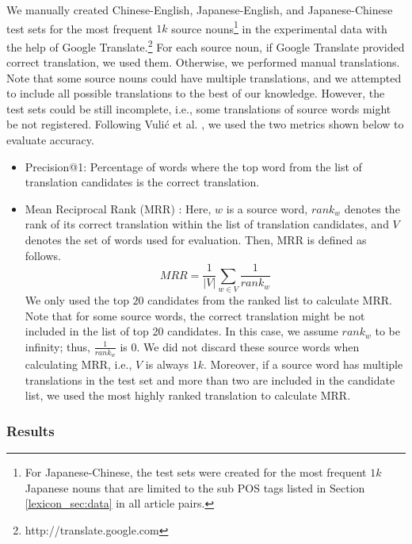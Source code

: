 \documentclass[english]{jnlp_1.4}
\begin{document}
We manually created Chinese-English, Japanese-English, and Japanese-Chinese test sets for
the most frequent $1k$ source nouns\footnote{For Japanese-Chinese,
the test sets were created for the most frequent $1k$ Japanese nouns that are limited to the sub POS tags
listed in Section \ref{lexicon_sec:data} in all article pairs.}
in the experimental data with the 
help of Google Translate.\footnote{http://translate.google.com} 
For each source noun, if Google Translate provided correct translation, we 
used them. Otherwise, we performed manual translations. 
Note that some source nouns could have multiple translations, and we attempted to include all 
possible translations to the best of our knowledge. However, the test sets could be still incomplete, 
i.e., some translations of source words might be not registered. 
Following Vuli\'{c} et al. \citeyear{vulic-desmet-moens:2011:ACL-HLT2011}, we used 
the two metrics shown below to evaluate accuracy.
\begin{itemize}
\item Precision@1: Percentage of words where the top word from the
      list of translation candidates is the correct translation.
\item Mean Reciprocal Rank (MRR) \cite{Voorhees-MRR:1999}: Here, $w$
      is a source word, $rank_w$ denotes the rank of its correct
      translation within the list of translation candidates, and $V$ denotes
      the set of words used for evaluation. Then, MRR is defined as follows.
\begin{equation}
MRR=\frac{1}{|V|}\sum_{w\in{V}}\frac{1}{rank_w}
\end{equation}
We only used the top $20$ candidates from the ranked list
to calculate MRR. Note that for some source words, the correct translation 
  might be not included in the list of top 20 candidates. In this case, we assume $rank_w$
  to be infinity; thus, $\frac{1}{rank_w}$ is 0. We did not discard these
  source words when calculating MRR, i.e., $V$ is always $1k$. Moreover, if a 
  source word has multiple translations in the test set and more than two are 
  included in the candidate list, we used the most highly ranked translation to calculate MRR.
\end{itemize}


\subsubsection{Results}
\label{lexicon_sec:results}
\end{document}
